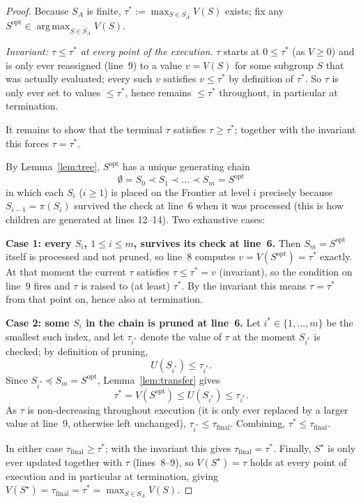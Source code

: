 \documentclass[11pt]{article}
\DeclareMathOperator{\argmax}{arg\,max}
\begin{document}
\begin{proof}
Because $S_A$ is finite, $\tau^\ast:=\max_{S\in S_A}V(S)$ exists; fix any
$S^{\mathrm{opt}}\in\argmax_{S\in S_A}V(S)$.

\smallskip
\emph{Invariant: $\tau\le\tau^\ast$ at every point of the execution.}
$\tau$ starts at $0\le\tau^\ast$ (as $V\ge0$) and is only ever reassigned (line~9) to a
value $v=V(S)$ for some subgroup $S$ that was actually evaluated; every such $v$
satisfies $v\le\tau^\ast$ by definition of $\tau^\ast$. So $\tau$ is only ever set to
values $\le\tau^\ast$, hence remains $\le\tau^\ast$ throughout, in particular at
termination.

\smallskip
It remains to show that the terminal $\tau$ satisfies $\tau\ge\tau^\ast$; together with
the invariant this forces $\tau=\tau^\ast$.

By Lemma~\ref{lem:tree}, $S^{\mathrm{opt}}$ has a unique generating chain
\[
\emptyset=S_0\prec S_1\prec\dots\prec S_m=S^{\mathrm{opt}}
\]
in which each $S_i$ ($i\ge1$) is placed on the Frontier at level $i$ precisely because
$S_{i-1}=\pi(S_i)$ survived the check at line~6 when it was processed (this is how
children are generated at lines 12--14). Two exhaustive cases:

\smallskip
\noindent\textbf{Case 1: every $S_i$, $1\le i\le m$, survives its check at line~6.}
Then $S_m=S^{\mathrm{opt}}$ itself is processed and not pruned, so line~8 computes
$v=V(S^{\mathrm{opt}})=\tau^\ast$ exactly. At that moment the current $\tau$ satisfies
$\tau\le\tau^\ast=v$ (invariant), so the condition on line~9 fires and $\tau$ is raised
to (at least) $\tau^\ast$. By the invariant this means $\tau=\tau^\ast$ from that point
on, hence also at termination.

\smallskip
\noindent\textbf{Case 2: some $S_i$ in the chain is pruned at line~6.}
Let $i^\ast\in\{1,\dots,m\}$ be the smallest such index, and let $\tau_{i^\ast}$ denote
the value of $\tau$ at the moment $S_{i^\ast}$ is checked; by definition of pruning,
\[
U(S_{i^\ast})\le\tau_{i^\ast}.
\]
Since $S_{i^\ast}\preceq S_m=S^{\mathrm{opt}}$, Lemma~\ref{lem:transfer} gives
\[
\tau^\ast=V(S^{\mathrm{opt}})\le U(S_{i^\ast})\le\tau_{i^\ast}.
\]
As $\tau$ is non-decreasing throughout execution (it is only ever replaced by a larger
value at line~9, otherwise left unchanged), $\tau_{i^\ast}\le\tau_{\mathrm{final}}$.
Combining, $\tau^\ast\le\tau_{\mathrm{final}}$.

\smallskip
In either case $\tau_{\mathrm{final}}\ge\tau^\ast$; with the invariant this gives
$\tau_{\mathrm{final}}=\tau^\ast$. Finally, $S^\star$ is only ever updated together
with $\tau$ (lines~8--9), so $V(S^\star)=\tau$ holds at every point of execution and
in particular at termination, giving $V(S^\star)=\tau_{\mathrm{final}}=\tau^\ast=
\max_{S\in S_A}V(S)$.
\end{proof}
\end{document}
